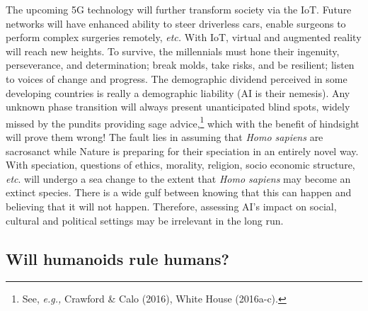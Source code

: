 \begin{multicols}{2}
\vskip 2pt

The upcoming 5G technology will further transform society via the IoT. Future networks will have enhanced ability to steer driverless cars, enable surgeons to perform complex surgeries remotely, \textit{etc.} With IoT, virtual and augmented reality will reach new heights. To survive, the millennials must hone their ingenuity, perseverance, and determination; break molds, take risks, and be resilient; listen to voices of change and progress. The demographic dividend perceived in some developing countries is really a demographic liability (AI is their nemesis). Any unknown phase transition will always present unanticipated blind spots, widely missed by the pundits providing sage advice,\footnote{See, \textit{e.g.,} Crawford \& Calo (2016), White House (2016a-c).}  which with the benefit of hindsight will prove them wrong! The fault lies in assuming that \textit{Homo sapiens} are sacrosanct while Nature is preparing for their speciation in an entirely novel way. With speciation, questions of ethics, morality, religion, socio economic structure, \textit{etc}. will undergo a sea change to the extent that \textit{Homo sapiens} may become an extinct species. There is a wide gulf between knowing that this can happen and believing that it will not happen. Therefore, assessing AI's impact on social, cultural and political settings may be irrelevant in the long run.

\subsection*{Will humanoids rule humans?}


\end{multicols}
